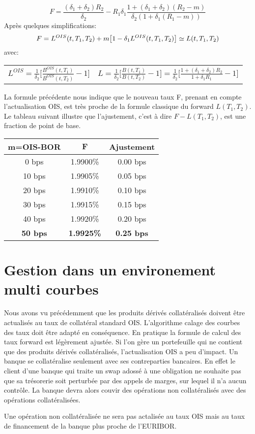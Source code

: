 \documentclass{article}
\begin{document}
\[
F=\frac{(\delta_1+\delta_2) R_2}{\delta_2}-R_1 \delta_1 \frac{1+(\delta_1+\delta_2) (R_2-m)}{\delta_2 (1+\delta_1 (R_1-m))}
\]
Après quelques simplifications:\\
\[
F=L^{OIS}(t,T_1,T_2)+m \big[ 1 - \delta_1 L^{OIS}(t,T_1,T_2) \big] \simeq L(t,T_1,T_2) \\
\]
avec:\\
\begin{center}
\begin{tabular}{c c}
$L^{OIS}=\frac{1}{\delta_2}\big[ \frac{B^{OIS}(t,T_1)}{B^{OIS}(t,T_2)}-1 \big]$&
$L=\frac{1}{\delta_2}\big[ \frac{B(t,T_1)}{B(t,T_2)}-1 \big]=\frac{1}{\delta_2}\big[\frac{1+(\delta_1+\delta_2) R_2}{1+\delta_1 R_1}-1\big]$\\
\end{tabular}
\end{center}
La formule précédente nous indique que le nouveau taux F, prenant en compte l'actualisation OIS, est très proche de la formule classique du forward $L(T_1,T_2)$. Le tableau suivant illustre que l'ajustement, c'est à dire $F-L(T_1,T_2)$, est une fraction de point de base.
\begin{center}
\begin{tabular}{|c|c|c|}  
\hline  
\textbf{m=OIS-BOR} & $\textbf{F}$ & \textbf{Ajustement} \\ 
\hline  
0 bps & 1.9900\%&0.00 bps\\ 
10 bps & 1.9905\%&0.05 bps\\ 
20 bps & 1.9910\%&0.10 bps\\ 
30 bps & 1.9915\%&0.15 bps\\ 
40 bps & 1.9920\%&0.20 bps\\ 
\textbf{\color{red}50 bps} & \textbf{\color{red}1.9925\%}&\textbf{\color{red}0.25 bps}\\ 
\hline 
\end{tabular}
\end{center}
\section{Gestion dans un environement multi courbes}
Nous avons vu précédemment que les produits dérivés collatéralisés doivent être actualisés au taux de collatéral standard OIS. L'algorithme calage des courbes des taux doit être adapté en conséquence. En pratique la formule de calcul des taux forward est légèrement ajustée. Si l'on gère un portefeuille qui ne contient que des produits dérivés collatéralisés, l'actualisation OIS a peu d'impact. Un banque se collatéralise seulement avec ses contreparties bancaires. En effet le client d'une banque qui traite un swap adossé à une obligation ne souhaite pas que sa trésorerie soit perturbée par des appels de marges, sur lequel il n'a aucun contrôle. La banque devra alors couvir des opérations non collatéralisés avec des opérations collatéralisées.

Une opération non collatéralisée ne sera pas actalisée au taux OIS mais au taux de financement de la banque plus proche de l'EURIBOR.  
\end{document}
